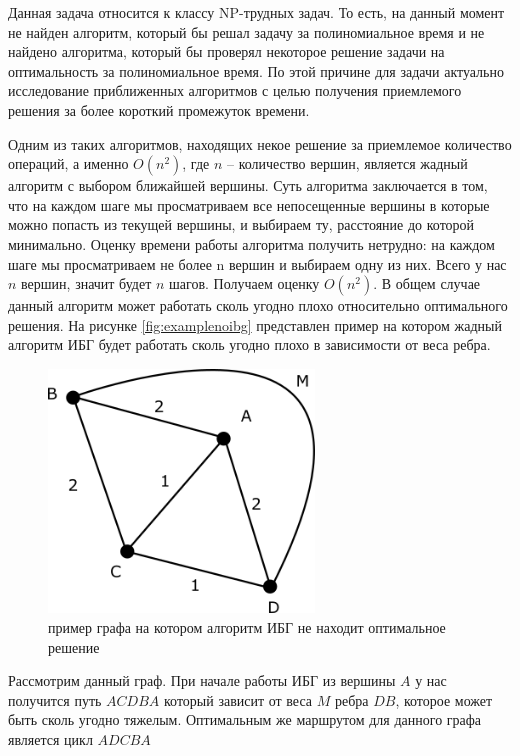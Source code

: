 \documentclass[a4paper, 14pt]{extarticle}
\numberwithin{equation}{section}
\begin{document}
Данная задача относится к классу NP-трудных задач. То есть, на данный момент не найден алгоритм, который бы решал задачу за полиномиальное время и не найдено алгоритма, который бы проверял некоторое решение задачи на оптимальность за полиномиальное время. По этой причине для задачи актуально исследование приближенных алгоритмов с целью получения приемлемого решения за более короткий промежуток времени.

Одним из таких алгоритмов, находящих некое решение за приемлемое количество операций, а именно $O(n^{2})$, где $n$ -- количество вершин, является жадный алгоритм с выбором ближайшей вершины. Суть алгоритма заключается в том, что на каждом шаге мы просматриваем все непосещенные вершины в которые можно попасть из текущей вершины, и выбираем ту, расстояние до которой минимально. Оценку времени работы алгоритма получить нетрудно: на каждом шаге мы просматриваем не более n вершин и выбираем одну из них. Всего у нас $n$ вершин, значит будет $n$ шагов. Получаем оценку $O(n^{2})$. В общем случае данный алгоритм может работать сколь угодно плохо относительно оптимального решения. На рисунке \eqref{fig:examplenoibg} представлен пример на котором жадный алгоритм ИБГ будет работать сколь угодно плохо в зависимости от веса ребра.

\begin{figure}[h!]
\begin{center}
\includegraphics[width=200pt]{ris_example.png}
\caption{пример графа на котором алгоритм ИБГ не находит оптимальное решение}
\label{fig:examplenoibg}
\end{center}
\end{figure}

Рассмотрим данный граф. При начале работы ИБГ из вершины $A$ у нас получится путь $ACDBA$ который зависит от веса $M$ ребра $DB$, которое может быть сколь угодно тяжелым. Оптимальным же маршрутом для данного графа является цикл $ADCBA$
\end{document}
